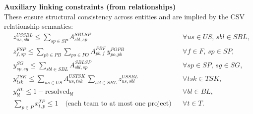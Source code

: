 \documentclass[11pt,a4paper]{article}
\begin{document}
\bigskip
\noindent\textbf{Auxiliary linking constraints (from relationships)} \\
These ensure structural consistency across entities and are implied by the CSV relationship semantics:
\begin{align*}
&z^{US SBL}_{us,sbl} \le \sum_{sp\in SP} A^{SBL SP}_{sbl,sp} && \forall us\in US,\, sbl\in SBL,\\
&z^{FSP}_{f,sp} \le \sum_{pb\in PB} \sum_{po\in PO} A^{PB F}_{pb,f}\, y^{PO PB}_{po,pb} && \forall f\in F,\, sp\in SP,\\
&y^{SG}_{sp,sg} \le \sum_{sbl\in SBL} A^{SBL SP}_{sbl,sp} && \forall sp\in SP,\, sg\in SG,\\
&y^{TSK}_{tsk} \le \sum_{us\in US} A^{US TSK}_{us,tsk}\, \sum_{sbl\in SBL} z^{US SBL}_{us,sbl} && \forall tsk\in TSK,\\
&y^{BL}_{bl} \le 1 - \text{resolved}_{bl} && \forall bl\in BL,\\
&\sum_{p\in P} x^{TP}_{t,p} \le 1 \quad\text{(each team to at most one project)} && \forall t\in T.
\end{align*}
\end{document}

